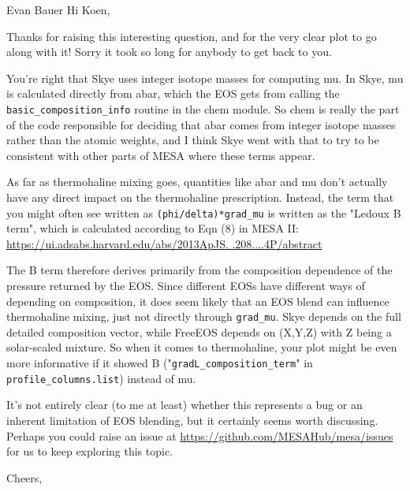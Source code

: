 \documentclass[a4paper,10pt]{article}
\begin{document}
\hspace{0.1\textwidth}\begin{minipage}{1.45\textwidth}
	\begin{shadequote}{Evan Bauer}
		Hi Koen,

		Thanks for raising this interesting question, and for the very clear plot to go along with it!
		Sorry it took so long for anybody to get back to you.

		You're right that Skye uses integer isotope masses for computing mu.
		In Skye, mu is calculated directly from abar, which the EOS gets from calling the \texttt{basic\_composition\_info} routine in the chem module.
		So chem is really the part of the code responsible for deciding that abar comes from integer isotope masses rather than the atomic weights, and I think Skye went with that to try to be consistent with other parts of MESA where these terms appear.

		As far as thermohaline mixing goes, quantities like abar and mu don't actually have any direct impact on the thermohaline prescription.
		Instead, the term that you might often see written as \texttt{(phi/delta)*grad\_mu} is written as the "Ledoux B term", which is calculated according to Eqn (8) in MESA II: \url{https://ui.adsabs.harvard.edu/abs/2013ApJS.
			.208....4P/abstract}

		The B term therefore derives primarily from the composition dependence of the pressure returned by the EOS.
		Since different EOSs have different ways of depending on composition, it does seem likely that an EOS blend can influence thermohaline mixing, just not directly through \texttt{grad\_mu}.
		Skye depends on the full detailed composition vector, while FreeEOS depends on (X,Y,Z) with Z being a solar-scaled mixture.
		So when it comes to thermohaline, your plot might be even more informative if it showed B ("\texttt{gradL\_composition\_term}" in \texttt{profile\_columns.list}) instead of mu.

		It's not entirely clear (to me at least) whether this represents a bug or an inherent limitation of EOS blending, but it certainly seems worth discussing.
		Perhaps you could raise an issue at \url{https://github.com/MESAHub/mesa/issues} for us to keep exploring this topic.

		Cheers,
	\end{shadequote}
\end{minipage}
\end{document}
